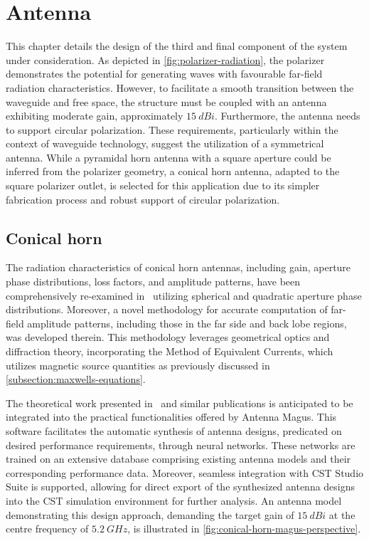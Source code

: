\documentclass[11pt,a4paper,twoside,openany]{report}
\begin{document}
\chapter{Antenna}
\label{chapter:antenna}
This chapter details the design of the third and final component of the system under consideration. As depicted in \cref{fig:polarizer-radiation}, the polarizer demonstrates the potential for generating waves with favourable far-field radiation characteristics. However, to facilitate a smooth transition between the waveguide and free space, the structure must be coupled with an antenna exhibiting moderate gain, approximately $\qty{15}{dBi}$. Furthermore, the antenna needs to support circular polarization. These requirements, particularly within the context of waveguide technology, suggest the utilization of a symmetrical antenna. While a pyramidal horn antenna with a square aperture could be inferred from the polarizer geometry, a conical horn antenna, adapted to the square polarizer outlet, is selected for this application due to its simpler fabrication process and robust support of circular polarization.

\section{Conical horn}
The radiation characteristics of conical horn antennas, including gain, aperture phase distributions, loss factors, and amplitude patterns, have been comprehensively re-examined in~\parencite{aboserwal-et-al:conical-horn-gain-and-amplitude-patterns} utilizing spherical and quadratic aperture phase distributions. Moreover, a novel methodology for accurate computation of far-field amplitude patterns, including those in the far side and back lobe regions, was developed therein. This methodology leverages geometrical optics and diffraction theory, incorporating the Method of Equivalent Currents, which utilizes magnetic source quantities as previously discussed in \cref{subsection:maxwells-equations}.

The theoretical work presented in~\parencite{aboserwal-et-al:conical-horn-gain-and-amplitude-patterns} and similar publications is anticipated to be integrated into the practical functionalities offered by Antenna Magus. This software facilitates the automatic synthesis of antenna designs, predicated on desired performance requirements, through neural networks. These networks are trained on an extensive database comprising existing antenna models and their corresponding performance data. Moreover, seamless integration with CST Studio Suite is supported, allowing for direct export of the synthesized antenna designs into the CST simulation environment for further analysis. An antenna model demonstrating this design approach, demanding the target gain of $\qty{15}{dBi}$ at the centre frequency of $\qty{5.2}{GHz}$, is illustrated in \cref{fig:conical-horn-magus-perspective}.
\end{document}

